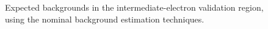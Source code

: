 \begin{figure}[tbp]
  \hfill
  \caption{Expected backgrounds in the intermediate-electron validation region, using the
    nominal background estimation techniques.}
  \label{fig:model-independent-VR-intermediate-e}
\end{figure}

